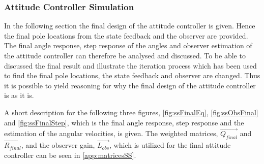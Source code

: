 \subsubsection{Attitude Controller Simulation}
In the following section the final design of the attitude controller is given. Hence the final pole locations from the state feedback and the observer are provided. The final angle response, step response of the angles and observer estimation of the attitude controller can therefore be analysed and discussed. To be able to discussed the final result and illustrate the iteration process which has been used to find the final pole locations, the state feedback and observer are changed. Thus it is possible to yield reasoning for why the final design of the attitude controller is as it is.

A short description for the following three figures, \autoref{fig:ssFinalEq}, \autoref{fig:ssObsFinal} and \autoref{fig:ssFinalStep}, which is the final angle response, step response and the estimation of the angular velocities, is given. The weighted matrices, $\vec{Q_{final}}$ and $\vec{R_{final}}$, and the observer gain, $\vec{L_{obs}}$, which is utilized for the final attitude controller can be seen in \autoref{app:matricesSS}.

